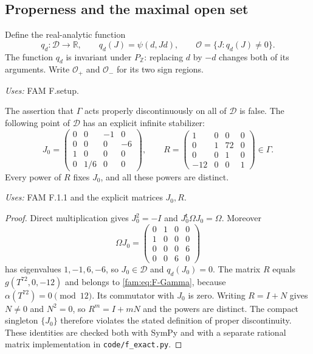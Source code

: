 \subsection{Properness and the maximal open set}
\begin{definition}\label{fam:F.2.setup}
Define the real-analytic function
\[
 q_d:\mathcal D\longrightarrow\mathbb R,\qquad q_d(J)=\psi(d,Jd),
 \qquad\mathcal O=\{J:q_d(J)\ne0\}.
\]
The function $q_d$ is invariant under $P_{\mathbb Z}$: replacing $d$ by
$-d$ changes both of its arguments.  Write $\mathcal O_+$ and
$\mathcal O_-$ for its two sign regions.
\end{definition}
\noindent\emph{Uses:} FAM F.setup.\par

\begin{proposition}[FAM F.2.1; T]\label{fam:F.2.1}
The assertion that $\Gamma$ acts properly discontinuously on all of
$\mathcal D$ is false.  The following point of $\mathcal D$ has an
explicit infinite stabilizer:
\[
 J_0=\begin{pmatrix}
 0&0&-1&0\\0&0&0&-6\\1&0&0&0\\0&1/6&0&0
 \end{pmatrix},\qquad
 R=\begin{pmatrix}
 1&0&0&0\\0&1&72&0\\0&0&1&0\\-12&0&0&1
 \end{pmatrix}\in\Gamma.
\]
Every power of $R$ fixes $J_0$, and all these powers are distinct.
\end{proposition}
\noindent\emph{Uses:} FAM F.1.1 and the explicit matrices $J_0,R$.\par

\begin{proof}
Direct multiplication gives $J_0^2=-I$ and
$J_0^{\mathsf t}\Omega J_0=\Omega$.  Moreover
\[
 \Omega J_0=\begin{pmatrix}
 0&1&0&0\\1&0&0&0\\0&0&0&6\\0&0&6&0
 \end{pmatrix}
\]
has eigenvalues $1,-1,6,-6$, so $J_0\in\mathcal D$ and $q_d(J_0)=0$.
The matrix $R$ equals $g(T^{72},0,-12)$ and belongs to \eqref{fam:eq:F-Gamma},
because $\alpha(T^{72})=0\pmod{12}$.  Its commutator with $J_0$ is zero.
Writing $R=I+N$ gives $N\ne0$ and $N^2=0$, so $R^m=I+mN$ and the
powers are distinct.  The compact singleton $\{J_0\}$ therefore violates
the stated definition of proper discontinuity.  These identities are
checked both with SymPy and with a separate rational matrix
implementation in \texttt{code/f\_exact.py}.
\end{proof}

